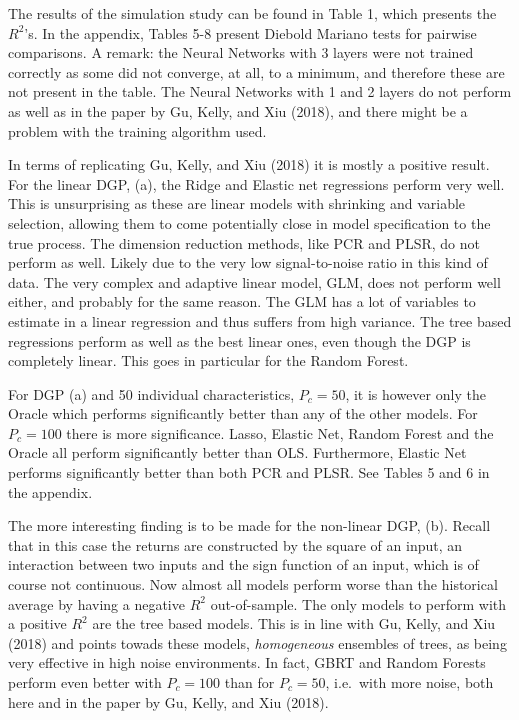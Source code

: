 \documentclass[11pt]{article}
\begin{document}
The results of the simulation study can be found in Table 1, which presents the \(R^2\)'s. In the appendix, Tables 5-8 present Diebold Mariano tests for pairwise comparisons. A remark: the Neural Networks with 3 layers were not trained correctly as some did not converge, at all, to a minimum, and therefore these
are not present in the table. The Neural Networks with 1 and 2 layers do not perform as well as in the paper by Gu, Kelly, and Xiu (2018), and there might be a problem with the training algorithm used.

In terms of replicating Gu, Kelly, and Xiu (2018) it is mostly a
positive result. For the linear DGP, (a), the Ridge and Elastic net
regressions perform very well. This is unsurprising as these are linear
models with shrinking and variable selection, allowing them to come
potentially close in model specification to the true process. The
dimension reduction methods, like PCR and PLSR, do not perform as well.
Likely due to the very low signal-to-noise ratio in this kind of data.
The very complex and adaptive linear model, GLM, does not perform well
either, and probably for the same reason. The GLM has a lot of variables
to estimate in a linear regression and thus suffers from high variance.
The tree based regressions perform as well as the best linear ones, even
though the DGP is completely linear. This goes in particular for the
Random Forest. 

For DGP (a) and 50 individual characteristics, \(P_c = 50 \), it is however only the Oracle which performs significantly better than any of the other models. For \(P_c = 100 \) there is more significance. Lasso, Elastic Net, Random Forest and the Oracle all perform significantly better than OLS. Furthermore, Elastic Net performs significantly better than both PCR and PLSR. See Tables 5 and 6 in the appendix.

The more interesting finding is to be made for the non-linear DGP, (b).
Recall that in this case the returns are constructed by the square of an
input, an interaction between two inputs and the sign function of an
input, which is of course not continuous. Now almost all models perform
worse than the historical average by having a negative \(R^2\)
out-of-sample. The only models to perform with a positive \(R^2\) are
the tree based models. This is in line with Gu, Kelly, and Xiu (2018)
and points towads these models, \emph{homogeneous} ensembles of trees,
as being very effective in high noise environments. In fact, GBRT and
Random Forests perform even better with \(P_c=100\) than for \(P_c=50\),
i.e.~with more noise, both here and in the paper by Gu, Kelly, and Xiu
(2018).
\end{document}
